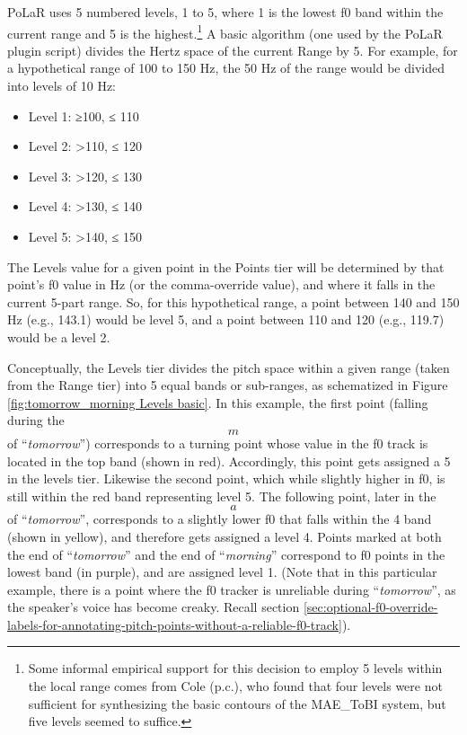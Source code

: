 \documentclass[11pt, twoside]{memoir}
\def\langtext#1{\textit{#1}}
\def\ipabrackets#1{\[{#1}\]}
\begin{document}
PoLaR uses 5 numbered levels, 1 to 5, where 1 is the lowest f0 band within the current range and 5 is the highest.\footnote{Some informal empirical support for this decision to employ 5 levels within the local range comes from Cole (p.c.), who found that four levels were not sufficient for synthesizing the basic contours of the MAE\_ToBI system, but five levels seemed to suffice.} A basic algorithm (one used by the PoLaR plugin script) divides the Hertz space of the current Range by 5. For example, for a hypothetical range of 100 to 150 Hz, the 50 Hz of the range would be divided into levels of 10 Hz:

\begin{itemize}
\item Level 1: ≥100, ≤ 110
\item Level 2: >110, ≤ 120
\item Level 3: >120, ≤ 130
\item Level 4: >130, ≤ 140
\item Level 5: >140, ≤ 150 \end{itemize}

The Levels value for a given point in the Points tier will be determined by that point’s f0 value in Hz (or the comma-override value), and where it falls in the current 5-part range. So, for this hypothetical range, a point between 140 and 150 Hz (e.g., 143.1) would be level 5, and a point between 110 and 120 (e.g., 119.7) would be a level 2.

Conceptually, the Levels tier divides the pitch space within a given range (taken from the Range tier) into 5 equal bands or sub-ranges, as schematized in Figure \ref{fig:tomorrow_morning Levels basic}. In this example, the first point (falling during the \ipabrackets{m} of “\langtext{tomorrow}”) corresponds to a turning point whose value in the f0 track is located in the top band (shown in red). Accordingly, this point gets assigned a 5 in the levels tier. Likewise the second point, which while slightly higher in f0, is still within the red band representing level 5. The following point, later in the \ipabrackets{a} of “\langtext{tomorrow}”, corresponds to a slightly lower f0 that falls within the 4 band (shown in yellow), and therefore gets assigned a level 4. Points marked at both the end of “\langtext{tomorrow}” and the end of “\langtext{morning}” correspond to f0 points in the lowest band (in purple), and are assigned level 1. (Note that in this particular example, there is a point where the f0 tracker is unreliable during “\langtext{tomorrow}”, as the speaker’s voice has become creaky. Recall section \ref{sec:optional-f0-override-labels-for-annotating-pitch-points-without-a-reliable-f0-track}).
\end{document}

